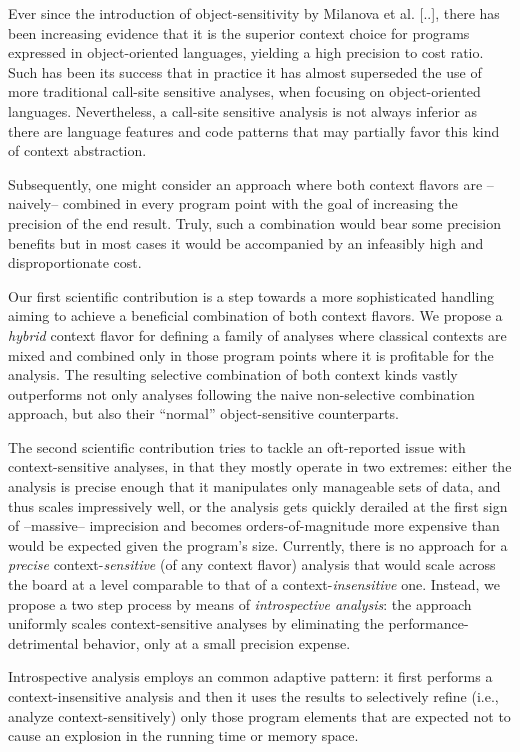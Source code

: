 Ever since the introduction of object-sensitivity by Milanova et al. [..], there has been increasing evidence that it is the superior context choice for programs expressed in object-oriented languages, yielding a high precision to cost ratio. Such has been its success that in practice it has almost superseded the use of more traditional call-site sensitive analyses, when focusing on object-oriented languages. Nevertheless, a call-site sensitive analysis is not always inferior as there are language features and code patterns that may partially favor this kind of context abstraction.

Subsequently, one might consider an approach where both context flavors are --naively-- combined in every program point with the goal of increasing the precision of the end result. Truly, such a combination would bear some precision benefits but in most cases it would be accompanied by an infeasibly high and disproportionate cost.

Our first scientific contribution is a step towards a more sophisticated handling aiming to achieve a beneficial combination of both context flavors. We propose a \emph{hybrid} context flavor for defining a family of analyses where classical contexts are mixed and combined only in those program points where it is profitable for the analysis. The resulting selective combination of both context kinds vastly outperforms not only analyses following the naive non-selective combination approach, but also their ``normal'' object-sensitive counterparts.

The second scientific contribution tries to tackle an oft-reported issue with context-sensitive analyses, in that they mostly operate in two extremes: either the analysis is precise enough that it manipulates only manageable sets of data, and thus scales impressively well, or the analysis gets quickly derailed at the first sign of --massive-- imprecision and becomes orders-of-magnitude more expensive than would be expected given the program's size. Currently, there is no approach for a \emph{precise} context-\emph{sensitive} (of any context flavor) analysis that would scale across the board at a level comparable to that of a context-\emph{insensitive} one. Instead, we propose a two step process by means of \emph{introspective analysis}: the approach uniformly scales context-sensitive analyses by eliminating the performance-detrimental behavior, only at a small precision expense.

Introspective analysis employs an common adaptive pattern: it first performs a context-insensitive analysis and then it uses the results to selectively refine (i.e., analyze context-sensitively) only those program elements that are expected not to cause an explosion in the running time or memory space.


